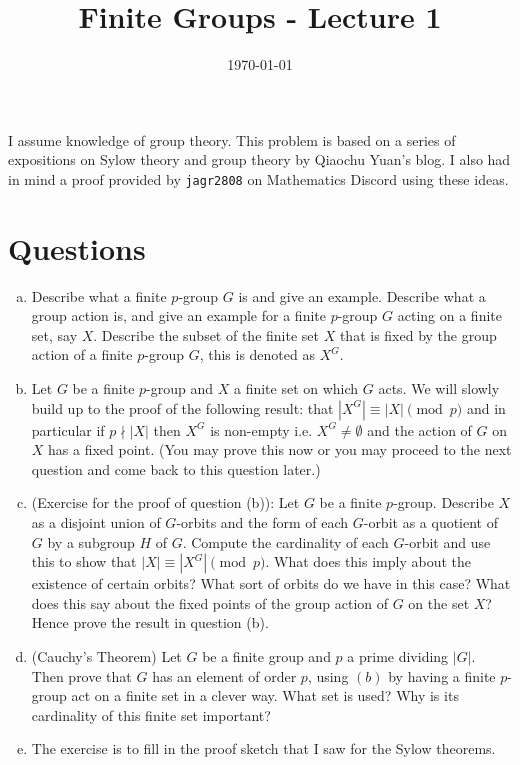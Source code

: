 \documentclass[12pt]{article}
\title{Finite Groups - Lecture 1}
\author{}
\date{\today}
\begin{document}
\maketitle

I assume knowledge of group theory. 
This problem is based on a series of expositions on Sylow theory and group theory by Qiaochu Yuan's blog. 
I also had in mind a proof provided by \texttt{jagr2808} on Mathematics Discord using these ideas.

\section*{Questions}

\begin{enumerate}[(a)]
  \item Describe what a finite $p$-group $G$ is and give an example. 
  Describe what a group action is, 
  and give an example for a finite $p$-group $G$ acting on a finite set, say $X$.
  Describe the subset of the finite set $X$ that is fixed by the group action of 
  a finite $p$-group $G$, this is denoted as $X^G$.
  \item Let $G$ be a finite $p$-group and $X$ a finite set on which $G$ acts.
  We will slowly build up to the proof of the following result: that $|X^G| \equiv |X| \pmod {p}$
  and in particular if $p \nmid |X|$ then $X^G$ is non-empty i.e. $X^G \neq \emptyset$ and the action of $G$ on $X$
  has a fixed point. (You may prove this now or you may proceed to the next question and come back to this question later.)
  \item (Exercise for the proof of question (b)): Let $G$ be a finite $p$-group.
  Describe $X$ as a disjoint union of $G$-orbits and the form of each $G$-orbit as a quotient of $G$ by a subgroup $H$ of $G$. Compute the cardinality of each $G$-orbit and 
  use this to show that $|X| \equiv |X^G| \pmod{p}$. What does this imply about the existence of certain orbits?
  What sort of orbits do we have in this case? 
  What does this say about the fixed points of the group action of $G$ on the set $X$?
  Hence prove the result in question (b).
  \item (Cauchy's Theorem) Let $G$ be a finite group and $p$ a prime dividing $|G|$.
  Then prove that $G$ has an element of order $p$, using $(b)$ by having a finite $p$-group act on a finite set in a clever way. What set is used? Why is its cardinality of this finite set important?

  \item The exercise is to fill in the proof sketch that I saw for the Sylow theorems.
  

\end{enumerate}
\end{document}
